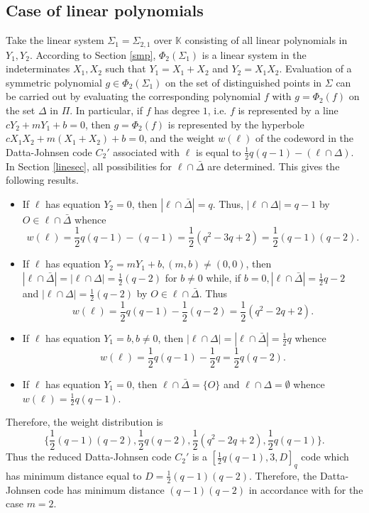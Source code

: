\documentclass[sn-mathphys-num]{sn-jnl}%
\begin{document}
 \subsection{Case of linear polynomials}
 \label{lp1}
Take the linear system $\Sigma_1=\Sigma_{2,1}$ over $\mathbb{K}$ consisting of all linear polynomials in $Y_1,Y_2$. According to Section \ref{smp},  $\Phi_2(\Sigma_1)$ is a linear system in the indeterminates $X_1,X_2$ such that $Y_1=X_1+X_2$ and $Y_2=X_1X_2$.
Evaluation of a symmetric polynomial $g\in \Phi_2(\Sigma_1)$ on the set of distinguished points in $\Sigma$ can be carried out by evaluating the corresponding polynomial $f$ with $g=\Phi_2(f)$ on the set $\Delta$ in $\Pi$. In particular, if $f$ has degree $1$, i.e. $f$ is represented by a line
$cY_2+mY_1+b=0$, then $g=\Phi_2(f)$ is represented by the hyperbole $cX_1X_2+m(X_1+X_2)+b=0$, and the weight $w(\ell)$ of the codeword in the Datta-Johnsen code $C_2'$ associated with $\ell$ is equal to $\frac{1}{2} q(q-1)-(\ell\cap \Delta)$. In Section \ref{linesec}, all possibilities for $\ell\cap \bar{\Delta}$ are determined. This gives the following results.
\begin{itemize}
    \item If $\ell$ has equation $Y_2=0$, then $|\ell\cap\bar{\Delta}|=q$. Thus, $|\ell\cap\Delta|=q-1$ by  $O\in\ell\cap\bar{\Delta}$ whence
    $$w(\ell)=\textstyle{\frac{1}{2}}q(q-1)-(q-1)=\textstyle{\frac{1}{2}}(q^2-3q+2)=\textstyle{\frac{1}{2}}(q-1)(q-2).$$
    \item If $\ell$ has equation $Y_2=mY_1+b, (m,b)\ne(0,0)$, then  $|\ell\cap\bar{\Delta}|=|\ell\cap\Delta|=\textstyle{\frac{1}{2}}(q-2)$ for $b\ne0$ while, if $b= 0, |\ell\cap\bar{\Delta}|=\textstyle{\frac{1}{2}}q-2$ and $|\ell\cap\Delta|=\textstyle{\frac{1}{2}}(q-2)$ by $O\in\ell\cap\bar{\Delta}$. Thus  $$w(\ell)=\textstyle{\frac{1}{2}}q(q-1)-\textstyle{\frac{1}{2}}(q-2)=\textstyle{\frac{1}{2}}(q^2-2q+2).$$
    \item If $\ell$ has equation $Y_1=b, b\ne0$, then  $|\ell\cap\Delta|=|\ell\cap\bar{\Delta}|=\textstyle{\frac{1}{2}}q$ whence
    $$w(\ell)=\textstyle{\frac{1}{2}}q(q-1)-\textstyle{\frac{1}{2}}q=\textstyle{\frac{1}{2}}q(q-2).$$
    \item If $\ell$ has equation $Y_1=0$, then $\ell\cap\bar{\Delta}=\{O\}$ and $\ell\cap\Delta=\emptyset$ whence
    $w(\ell)=\textstyle{\frac{1}{2}}q(q-1).$
\end{itemize}

Therefore, the weight distribution is $$\big\{\textstyle{\frac{1}{2}}(q-1)(q-2),\textstyle{\frac{1}{2}} q(q-2), \textstyle{\frac{1}{2}}(q^2-2q+2), \textstyle{\frac{1}{2}} q(q-1)\big\}.$$  Thus the reduced Datta-Johnsen code $C_2'$ is a $\left[\frac{1}{2} q(q-1),3,D\right]_q$ code which has minimum distance equal to $D=\frac{1}{2}(q-1)(q-2)$. Therefore, the Datta-Johnsen code has minimum distance $(q-1)(q-2)$ in accordance with \cite[Proposition 3.2]{datta2023codes} for the case $m=2$.
\end{document}
